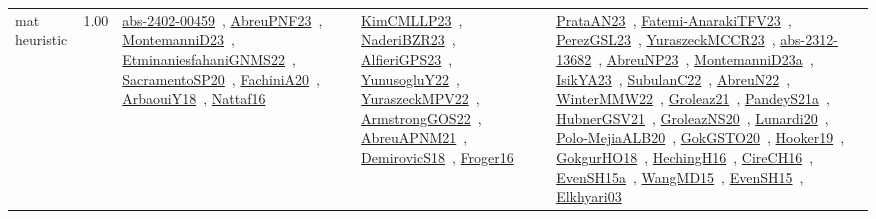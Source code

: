 {\begin{longtable}{p{3cm}r>{\raggedright\arraybackslash}p{6cm}>{\raggedright\arraybackslash}p{6cm}>{\raggedright\arraybackslash}p{8cm}}
\index{mat heuristic}\index{Algorithms!mat heuristic}mat heuristic &  1.00 & \href{../works/abs-2402-00459.pdf}{abs-2402-00459}~\cite{abs-2402-00459}, \href{../works/AbreuPNF23.pdf}{AbreuPNF23}~\cite{AbreuPNF23}, \href{../works/MontemanniD23.pdf}{MontemanniD23}~\cite{MontemanniD23}, \href{../works/EtminaniesfahaniGNMS22.pdf}{EtminaniesfahaniGNMS22}~\cite{EtminaniesfahaniGNMS22}, \href{../works/SacramentoSP20.pdf}{SacramentoSP20}~\cite{SacramentoSP20}, \href{../works/FachiniA20.pdf}{FachiniA20}~\cite{FachiniA20}, \href{../works/ArbaouiY18.pdf}{ArbaouiY18}~\cite{ArbaouiY18}, \href{../works/Nattaf16.pdf}{Nattaf16}~\cite{Nattaf16} & \href{../works/KimCMLLP23.pdf}{KimCMLLP23}~\cite{KimCMLLP23}, \href{../works/NaderiBZR23.pdf}{NaderiBZR23}~\cite{NaderiBZR23}, \href{../works/AlfieriGPS23.pdf}{AlfieriGPS23}~\cite{AlfieriGPS23}, \href{../works/YunusogluY22.pdf}{YunusogluY22}~\cite{YunusogluY22}, \href{../works/YuraszeckMPV22.pdf}{YuraszeckMPV22}~\cite{YuraszeckMPV22}, \href{../works/ArmstrongGOS22.pdf}{ArmstrongGOS22}~\cite{ArmstrongGOS22}, \href{../works/AbreuAPNM21.pdf}{AbreuAPNM21}~\cite{AbreuAPNM21}, \href{../works/DemirovicS18.pdf}{DemirovicS18}~\cite{DemirovicS18}, \href{../works/Froger16.pdf}{Froger16}~\cite{Froger16} & \href{../works/PrataAN23.pdf}{PrataAN23}~\cite{PrataAN23}, \href{../works/Fatemi-AnarakiTFV23.pdf}{Fatemi-AnarakiTFV23}~\cite{Fatemi-AnarakiTFV23}, \href{../works/PerezGSL23.pdf}{PerezGSL23}~\cite{PerezGSL23}, \href{../works/YuraszeckMCCR23.pdf}{YuraszeckMCCR23}~\cite{YuraszeckMCCR23}, \href{../works/abs-2312-13682.pdf}{abs-2312-13682}~\cite{abs-2312-13682}, \href{../works/AbreuNP23.pdf}{AbreuNP23}~\cite{AbreuNP23}, \href{../works/MontemanniD23a.pdf}{MontemanniD23a}~\cite{MontemanniD23a}, \href{../works/IsikYA23.pdf}{IsikYA23}~\cite{IsikYA23}, \href{../works/SubulanC22.pdf}{SubulanC22}~\cite{SubulanC22}, \href{../works/AbreuN22.pdf}{AbreuN22}~\cite{AbreuN22}, \href{../works/WinterMMW22.pdf}{WinterMMW22}~\cite{WinterMMW22}, \href{../works/Groleaz21.pdf}{Groleaz21}~\cite{Groleaz21}, \href{../works/PandeyS21a.pdf}{PandeyS21a}~\cite{PandeyS21a}, \href{../works/HubnerGSV21.pdf}{HubnerGSV21}~\cite{HubnerGSV21}, \href{../works/GroleazNS20.pdf}{GroleazNS20}~\cite{GroleazNS20}, \href{../works/Lunardi20.pdf}{Lunardi20}~\cite{Lunardi20}, \href{../works/Polo-MejiaALB20.pdf}{Polo-MejiaALB20}~\cite{Polo-MejiaALB20}, \href{../works/GokGSTO20.pdf}{GokGSTO20}~\cite{GokGSTO20}, \href{../works/Hooker19.pdf}{Hooker19}~\cite{Hooker19}, \href{../works/GokgurHO18.pdf}{GokgurHO18}~\cite{GokgurHO18}, \href{../works/HechingH16.pdf}{HechingH16}~\cite{HechingH16}, \href{../works/CireCH16.pdf}{CireCH16}~\cite{CireCH16}, \href{../works/EvenSH15a.pdf}{EvenSH15a}~\cite{EvenSH15a}, \href{../works/WangMD15.pdf}{WangMD15}~\cite{WangMD15}, \href{../works/EvenSH15.pdf}{EvenSH15}~\cite{EvenSH15}, \href{../works/Elkhyari03.pdf}{Elkhyari03}~\cite{Elkhyari03}\\

\end{longtable}}
